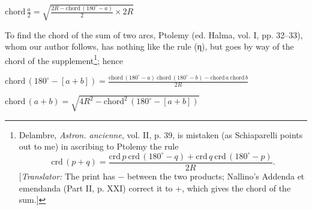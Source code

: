 \documentclass[11pt]{article}
\newcommand{\Pg}[1]{\marginpar{\footnotesize\color{gray}#1}}
\begin{document}
\par\noindent\hspace*{1.5em}$\displaystyle \text{chord}\,\frac{a}{2} = \sqrt{\frac{2R - \text{chord}\,(180^\circ - a)}{2} \times 2R}$\par\par\smallskip
\par \Pg{I 154}To find the chord of the sum of two arcs, Ptolemy (ed. Halma, vol. I, pp. 32–33), whom our author follows, has nothing like the rule ({\greekfont η}), but goes by way of the chord of the supplement\footnote{Delambre, \emph{Astron. ancienne}, vol. II, p. 39, is mistaken (as Schiaparelli points out to me) in ascribing to Ptolemy the rule \[ \text{crd}\,(p + q) = \frac{\text{crd}\,p\ \text{crd}\,(180^\circ - q) + \text{crd}\,q\ \text{crd}\,(180^\circ - p)}{2R}. \] [\emph{Translator:} The print has − between the two products; Nallino's Addenda et emendanda (Part II, p. XXI) correct it to +, which gives the chord of the sum.]}; hence \par\noindent\hspace*{1.5em}$\displaystyle \text{chord}\,(180^\circ - [a + b]) = \frac{\text{chord}\,(180^\circ - a)\ \text{chord}\,(180^\circ - b) - \text{chord}\,a\ \text{chord}\,b}{2R}$\par \par\noindent\hspace*{1.5em}$\displaystyle \text{chord}\,(a + b) = \sqrt{4R^2 - \text{chord}^2\,(180^\circ - [a + b])}$\par\par
\end{document}
